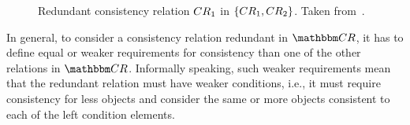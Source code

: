 \begin{figure}
    \centering
    
    \caption[Redundant consistency relation]{Redundant consistency relation $\consistencyrelation{CR}{1}$ in $\setted{\consistencyrelation{CR}{1}, \consistencyrelation{CR}{2}}$. Taken from~.}
    \label{fig:compatibility:redundancyrelationextremes}
\end{figure}

In general, to consider a consistency relation redundant in $\consistencyrelationset{CR}$, it has to define equal or weaker requirements for consistency than one of the other relations in $\consistencyrelationset{CR}$.
Informally speaking, such weaker requirements mean that the redundant relation must have weaker conditions, i.e., it must require consistency for less objects and consider the same or more objects consistent to each of the left condition elements. 

